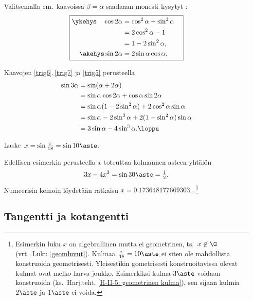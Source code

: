 Valitsemalla em.\ kaavoissa $\beta = \alpha$ saadaaan monesti kysytyt
:
\begin{equation} \label{trig7} \boxed{ \begin{aligned}
\ykehys\quad \cos 2\alpha &= \cos^2\alpha-\sin^2\alpha \quad \\ 
                          &= 2\cos^2 \alpha - 1 \\
                          &= 1-2\sin^2\alpha, \quad \\
     \akehys \sin 2\alpha &= 2\sin \alpha \cos \alpha.
\end{aligned} } \end{equation}
\begin{Exa} \label{sin kolme alpha} Kaavojen \eqref{trig6},\,\eqref{trig7} ja \eqref{trig5}
perusteella
\begin{align*}
\sin 3\alpha &= \sin (\alpha + 2\alpha) \\
&= \sin \alpha \cos 2\alpha + \cos \alpha \sin 2\alpha \\
&= \sin \alpha(1-2\sin^2 \alpha) + 2\cos^2 \alpha \sin \alpha \\
&= \sin \alpha - 2\sin^3 \alpha + 2(1-\sin^2 \alpha) \sin \alpha \\
&= 3\sin\alpha - 4\sin^3\alpha. \loppu
\end{align*}
\end{Exa}
\begin{Exa} \label{kulman kolmijako}
Laske $\,x = \sin\frac{\pi}{18} = \sin 10\aste$.
\end{Exa}
\ratk Edellisen esimerkin perusteella $x$ toteuttaa kolmannen asteen yhtälön
\[
3x - 4x^3 = \sin 30\aste = \tfrac{1}{2}.
\]
Numeerisin keinoin löydetään ratkaisu $x=0.173648177669303 \ldots$\footnote[2]{Esimerkin luku
$x$ on algebrallinen mutta ei geometrinen, ts.\ $x \not\in\G$ (vrt.\ Luku \ref{geomluvut}). 
Kulmaa $\frac{\pi}{18} = 10\aste$ ei siten ole mahdollista konstruoida geometrisesti.
Yleisestikin gometrisesti konstruoitavissa olevat kulmat ovat melko harva joukko. Esimerkiksi
kulma $3\aste$ voidaan konstruoida (ks.\ Harj.teht. \ref{H-II-5: geometrinen kulma}), sen
sijaan kulmia $2\aste$ ja $1\aste$ ei voida.} \loppu

\subsection{Tangentti ja kotangentti}

